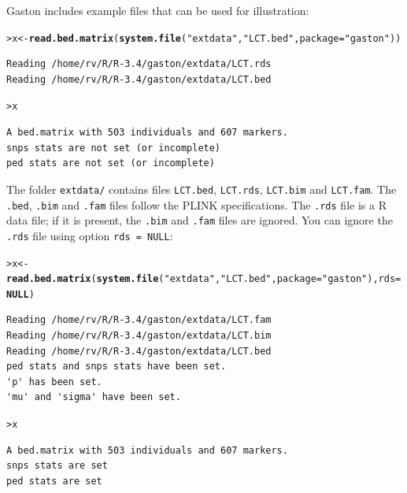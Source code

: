 \documentclass{article}\usepackage[]{graphicx}\usepackage[]{color}
\makeatletter
\newcommand{\hlstr}[1]{\textcolor[rgb]{0.192,0.494,0.8}{#1}}%
\newcommand{\hlstd}[1]{\textcolor[rgb]{0.345,0.345,0.345}{#1}}%
\newcommand{\hlkwa}[1]{\textcolor[rgb]{0.161,0.373,0.58}{\textbf{#1}}}%
\newcommand{\hlkwb}[1]{\textcolor[rgb]{0.69,0.353,0.396}{#1}}%
\newcommand{\hlkwc}[1]{\textcolor[rgb]{0.333,0.667,0.333}{#1}}%
\newcommand{\hlkwd}[1]{\textcolor[rgb]{0.737,0.353,0.396}{\textbf{#1}}}%
\newenvironment{kframe}{%
 \def\at@end@of@kframe{}%
 \ifinner\ifhmode%
  \def\at@end@of@kframe{\end{minipage}}%
  \begin{minipage}{\columnwidth}%
 \fi\fi%
 \def\FrameCommand##1{\hskip\@totalleftmargin \hskip-\fboxsep
 \colorbox{shadecolor}{##1}\hskip-\fboxsep
     \hskip-\linewidth \hskip-\@totalleftmargin \hskip\columnwidth}%
 \MakeFramed {\advance\hsize-\width
   \@totalleftmargin\z@ \linewidth\hsize
   \@setminipage}}%
 {\par\unskip\endMakeFramed%
 \at@end@of@kframe}
\newenvironment{knitrout}{}{} %
\makeatother
\begin{document}
  Gaston includes example files that can be used for illustration:

\begin{knitrout}
\color{fgcolor}\begin{kframe}
\begin{alltt}
\hlstd{> }\hlstd{x} \hlkwb{<-} \hlkwd{read.bed.matrix}\hlstd{(} \hlkwd{system.file}\hlstd{(}\hlstr{"extdata"}\hlstd{,} \hlstr{"LCT.bed"}\hlstd{,} \hlkwc{package}\hlstd{=}\hlstr{"gaston"}\hlstd{) )}
\end{alltt}
\begin{verbatim}
Reading /home/rv/R/R-3.4/gaston/extdata/LCT.rds 
Reading /home/rv/R/R-3.4/gaston/extdata/LCT.bed 
\end{verbatim}
\begin{alltt}
\hlstd{> }\hlstd{x}
\end{alltt}
\begin{verbatim}
A bed.matrix with 503 individuals and 607 markers.
snps stats are not set (or incomplete)
ped stats are not set (or incomplete)
\end{verbatim}
\end{kframe}
\end{knitrout}
  
  The folder \verb!extdata/! contains files \verb!LCT.bed!, \verb!LCT.rds!,
  \verb!LCT.bim! and \verb!LCT.fam!. The \verb!.bed!, \verb!.bim! and \verb!.fam! files follow the
  PLINK specifications. The \verb!.rds! file is a R data file; if it is present, the
  \verb!.bim! and \verb!.fam! files are ignored. You can ignore the
  \verb!.rds! file using option \verb!rds = NULL!:

\begin{knitrout}
\color{fgcolor}\begin{kframe}
\begin{alltt}
\hlstd{> }\hlstd{x} \hlkwb{<-} \hlkwd{read.bed.matrix}\hlstd{(} \hlkwd{system.file}\hlstd{(}\hlstr{"extdata"}\hlstd{,} \hlstr{"LCT.bed"}\hlstd{,} \hlkwc{package}\hlstd{=}\hlstr{"gaston"}\hlstd{),} \hlkwc{rds} \hlstd{=} \hlkwa{NULL} \hlstd{)}
\end{alltt}
\begin{verbatim}
Reading /home/rv/R/R-3.4/gaston/extdata/LCT.fam 
Reading /home/rv/R/R-3.4/gaston/extdata/LCT.bim 
Reading /home/rv/R/R-3.4/gaston/extdata/LCT.bed 
ped stats and snps stats have been set. 
'p' has been set. 
'mu' and 'sigma' have been set.
\end{verbatim}
\begin{alltt}
\hlstd{> }\hlstd{x}
\end{alltt}
\begin{verbatim}
A bed.matrix with 503 individuals and 607 markers.
snps stats are set
ped stats are set
\end{verbatim}
\end{kframe}
\end{knitrout}
\end{document}
